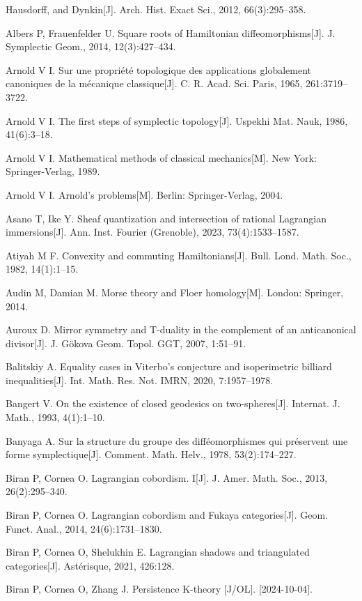 \begin{enumerate}[label={[\arabic*]},leftmargin=3.2em,itemsep=2pt,parsep=0pt]
        Hausdorff, and Dynkin[J]. Arch. Hist. Exact Sci., 2012, 66(3):295--358.
  \item Albers P, Frauenfelder U. Square roots of Hamiltonian diffeomorphisms[J].
        J. Symplectic Geom., 2014, 12(3):427--434.
  \item Arnold V I. Sur une propriété topologique des applications globalement canoniques
        de la mécanique classique[J]. C. R. Acad. Sci. Paris, 1965, 261:3719--3722.
  \item Arnold V I. The first steps of symplectic topology[J]. Uspekhi Mat. Nauk, 1986,
        41(6):3--18.
  \item Arnold V I. Mathematical methods of classical mechanics[M]. New York:
        Springer-Verlag, 1989.
  \item Arnold V I. Arnold's problems[M]. Berlin: Springer-Verlag, 2004.
  \item Asano T, Ike Y. Sheaf quantization and intersection of rational Lagrangian
        immersions[J]. Ann. Inst. Fourier (Grenoble), 2023, 73(4):1533--1587.
  \item Atiyah M F. Convexity and commuting Hamiltonians[J]. Bull. Lond. Math. Soc., 1982,
        14(1):1--15.
  \item Audin M, Damian M. Morse theory and Floer homology[M]. London: Springer, 2014.
  \item Auroux D. Mirror symmetry and T-duality in the complement of an anticanonical
        divisor[J]. J. Gökova Geom. Topol. GGT, 2007, 1:51--91.
  \item Balitskiy A. Equality cases in Viterbo's conjecture and isoperimetric billiard
        inequalities[J]. Int. Math. Res. Not. IMRN, 2020, 7:1957--1978.
  \item Bangert V. On the existence of closed geodesics on two-spheres[J].
        Internat. J. Math., 1993, 4(1):1--10.
  \item Banyaga A. Sur la structure du groupe des difféomorphismes qui préservent une forme
        symplectique[J]. Comment. Math. Helv., 1978, 53(2):174--227.
  \item Biran P, Cornea O. Lagrangian cobordism. I[J]. J. Amer. Math. Soc., 2013,
        26(2):295--340.
  \item Biran P, Cornea O. Lagrangian cobordism and Fukaya categories[J].
        Geom. Funct. Anal., 2014, 24(6):1731--1830.
  \item Biran P, Cornea O, Shelukhin E. Lagrangian shadows and triangulated
        categories[J]. Astérisque, 2021, 426:128.
  \item Biran P, Cornea O, Zhang J. Persistence K-theory [J/OL]. [2024-10-04].

\end{enumerate}
